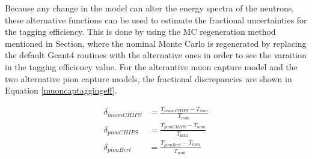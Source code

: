 Because any change in the model can alter the energy spectra of the neutrons, these alternative functions can be used to estimate the fractional uncertainties for the tagging efficiency. This is done by using the MC regeneration method mentioned in Section, where the nominal Monte Carlo is regenerated by replacing the default Geant4 routines with the alternative ones in order to see the varaition in the tagging efficiency value. For the alterantive muon capture model and the two alternative pion capture models, the fractional discrepancies are shown in Equation \ref{muoncaptaggingeff}.

\begin{equation}
    \begin{aligned}
        \delta_{muon C H I P S} &=\frac{T_{muon C H I P S}-T_{n o m}}{T_{\text {nom }}} \\
        \delta_{pion C H I P S} &=\frac{T_{pion C H I P S}-T_{n o m}}{T_{\text {nom }}} \\
        \delta_{pion B e r t} &=\frac{T_{pion B e r t}-T_{n o m}}{T_{\text {nom }}}
        \end{aligned}
        \label{muoncaptaggingeff}
\end{equation}

